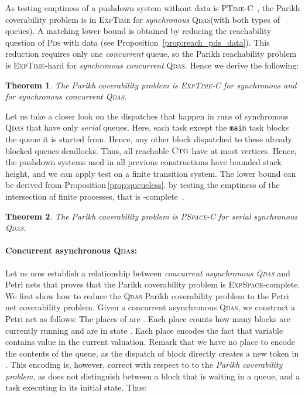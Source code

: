 \documentclass[runningheads,oribibl,]{article}
\newcommand{\pds}{\textsc{Pds}\xspace}
\newcommand{\qdas}{\textsc{Qdas}\xspace}
\newcommand{\dexpspace}{\textsc{ExpSpace}\xspace}
\newcommand{\pspacecomplete}{\textsc{PSpace-C}\xspace}
\newcommand{\ptimecomplete}{\textsc{PTime-C}\xspace}
\newcommand{\dexptime}{\textsc{ExpTime}\xspace}
\newcommand{\dexptimecomplete}{\textsc{ExpTime-C}\xspace}
\newcommand{\ctg}{\ensuremath{\textsc{Ctg}}\xspace}
\newtheorem{theorem}{Theorem}{}
\begin{document}
As testing emptiness of a pushdown system without data is
\ptimecomplete~\cite{bouajjani-a-1997-135-a}, the
Parikh coverability problem is in \dexptime for \emph{synchronous}
\qdas (with both types of queues). A matching lower bound is obtained
by reducing the reachability question of \pds with data (see
Proposition~\ref{prop:reach_pds_data}). This reduction requires only
one \emph{concurrent} queue, so the Parikh reachability problem is
\dexptime-hard for \emph{synchronous concurrent} \qdas. Hence we
derive the following:

\begin{theorem}\label{thm:syncqdas}
  The Parikh coverability problem is \dexptimecomplete for synchronous
  and for synchronous concurrent \qdas.
\end{theorem}






Let us take a closer look on the dispatches that happen in runs of
synchronous \qdas that have only \emph{serial} queues.
Here, each task except the \texttt{main} task blocks the queue it is
started
from. Hence, any other block dispatched to these already blocked
queues deadlocks. Thus, all reachable \ctg have at most
 vertices. Hence, the pushdown systems used in
all previous constructions have bounded stack height, and we can
apply test on a finite transition system.
 The lower bound can be
derived from Proposition\,\ref{prop:queueless}.
by testing the emptiness of the intersection
of  finite processes, that is -complete~\cite{kozen-d-1977-254-a}.


\begin{theorem}\label{thm:serialsyncqdas}
  The Parikh coverability problem is \pspacecomplete for serial
  synchronous \qdas.
\end{theorem}

\paragraph{\bf Concurrent asynchronous \qdas:}


Let us now establish a relationship between \emph{concurrent
asynchronous {\qdas}} and Petri nets that proves that the Parikh
coverability problem is \dexpspace-complete. We first show how to
reduce the \qdas Parikh coverability problem to the Petri net
coverability problem.
                    Given a concurrent asynchronous \qdas , we construct a Petri net  as
follows: The places of  are .
Each place   counts how many blocks are currently running and are in state . Each
place  encodes the fact that variable  contains value  in
the current valuation.  Remark that we have no place to encode the
contents of the queue, as the dispatch of block  directly
creates a new token in . This encoding is, however,
correct with respect to to the \emph{Parikh coverability problem}, as 
does not distinguish between a block  that is waiting in a
queue, and a task executing  in its initial state. Thus:
\end{document}
